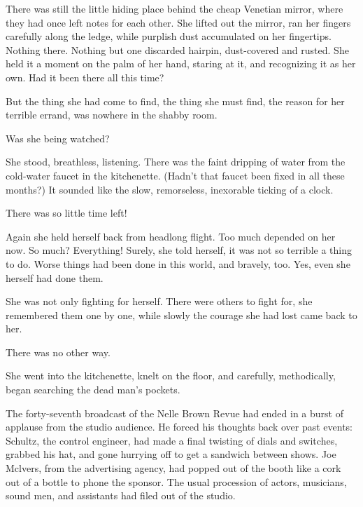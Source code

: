 \documentclass{novel}
\begin{document}
There was still the little hiding place behind the cheap Venetian mirror, where they had once left notes for each other. She lifted out the mirror, ran her fingers carefully along the ledge, while purplish dust accumulated on her fingertips. Nothing there. Nothing but one discarded hairpin, dust-covered and rusted. She held it a moment on the palm of her hand, staring at it, and recognizing it as her own. Had it been there all this time?

But the thing she had come to find, the thing she must find, the reason for her terrible errand, was nowhere in the shabby room.

Was she being watched?

She stood, breathless, listening. There was the faint dripping of water from the cold-water faucet in the kitchenette. (Hadn’t that faucet been fixed in all these months?) It sounded like the slow, remorseless, inexorable ticking of a clock.

There was so little time left!

Again she held herself back from headlong flight. Too much depended on her now. So much? Everything! Surely, she told herself, it was not so terrible a thing to do. Worse things had been done in this world, and bravely, too. Yes, even she herself had done them.

She was not only fighting for herself. There were others to fight for, she remembered them one by one, while slowly the courage she had lost came back to her.

There was no other way.

She went into the kitchenette, knelt on the floor, and carefully, methodically, began searching the dead man’s pockets.

\vspace{2\nbs}
\clearpage
\thispagestyle{empty}
\cleartorecto
\begin{ChapterStart}
\vspace{3\nbs}
\end{ChapterStart}

The forty-seventh broadcast of the Nelle Brown Revue had ended in a burst of applause from the studio audience. He forced his thoughts back over past events: Schultz, the control engineer, had made a final twisting of dials and switches, grabbed his hat, and gone hurrying off to get a sandwich between shows. Joe Mclvers, from the advertising agency, had popped out of the booth like a cork out of a bottle to phone the sponsor. The usual procession of actors, musicians, sound men, and assistants had filed out of the studio.
\end{document}
